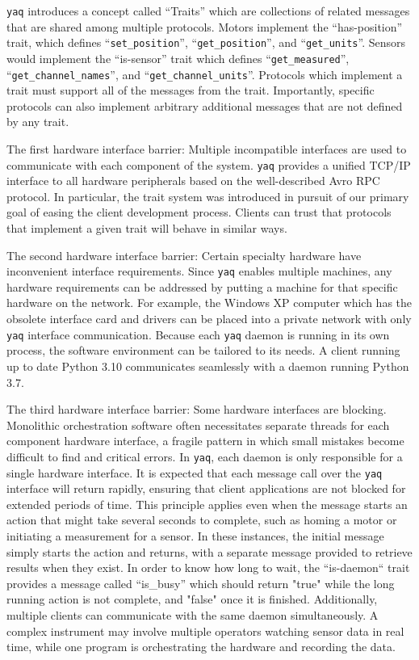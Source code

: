 \documentclass[aip, amsmath, amssymb, reprint,]{revtex4-1}
\newcommand\yaq{\texttt{yaq}}
\begin{document}
\yaq{} introduces a concept called ``Traits'' which are collections of related messages that are shared among multiple protocols.
Motors implement the ``has-position'' trait, which defines ``\texttt{set\_position}'', ``\texttt{get\_position}'', and ``\texttt{get\_units}''.
Sensors would implement the ``is-sensor'' trait which defines ``\texttt{get\_measured}'', ``\texttt{get\_channel\_names}'', and ``\texttt{get\_channel\_units}''. 
Protocols which implement a trait must support all of the messages from the trait.
Importantly, specific protocols can also implement arbitrary additional messages that are not defined by any trait.

The first hardware interface barrier: Multiple incompatible interfaces are used to communicate with each component of the system.
\yaq{} provides a unified TCP/IP interface to all hardware peripherals based on the well-described Avro RPC protocol.
In particular, the trait system was introduced in pursuit of our primary goal of easing the client development process.
Clients can trust that protocols that implement a given trait will behave in similar ways.

The second hardware interface barrier: Certain specialty hardware have inconvenient interface requirements.
Since \yaq{} enables multiple machines, any hardware requirements can be addressed by putting a machine for that specific hardware on the network.
For example, the Windows XP computer which has the obsolete interface card and drivers can be placed into a private network with only \yaq{} interface communication.
Because each \yaq{} daemon is running in its own process, the software environment can be tailored to its needs.
A client running up to date Python 3.10 communicates seamlessly with a daemon running Python 3.7.

The third hardware interface barrier: Some hardware interfaces are blocking.
Monolithic orchestration software often necessitates separate threads for each component hardware interface, a fragile pattern in which small mistakes become difficult to find and critical errors.
In \yaq{}, each daemon is only responsible for a single hardware interface.
It is expected that each message call over the \yaq{} interface will return rapidly, ensuring that client applications are not blocked for extended periods of time.
This principle applies even when the message starts an action that might take several seconds to complete, such as homing a motor or initiating a measurement for a sensor.
In these instances, the initial message simply starts the action and returns, with a separate message provided to retrieve results when they exist.
In order to know how long to wait, the ``is-daemon`` trait provides a message called ``is\_busy'' which should return "true" while the long running action is not complete, and "false" once it is finished.
Additionally, multiple clients can communicate with the same daemon simultaneously.
A complex instrument may involve multiple operators watching sensor data in real time, while one program is orchestrating the hardware and recording the data.
\end{document}
